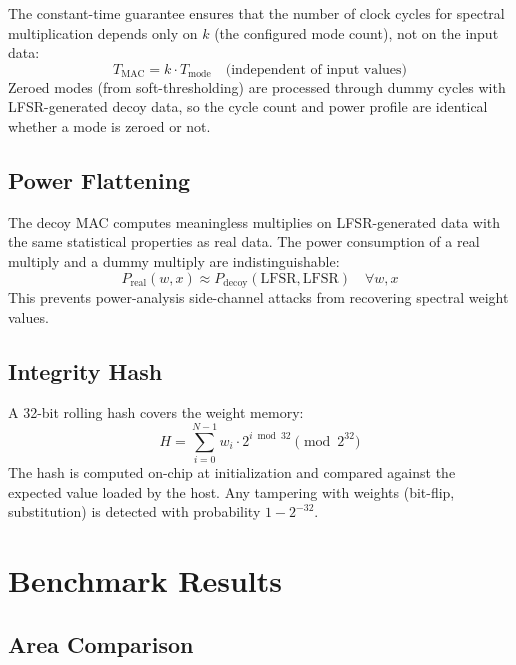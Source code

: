 \documentclass[11pt,a4paper]{article}
\theoremstyle{definition}
\theoremstyle{remark}
\begin{document}
The constant-time guarantee ensures that the number of clock cycles for spectral
multiplication depends only on $k$ (the configured mode count), not on the input
data:
\begin{equation}
  T_{\text{MAC}} = k \cdot T_{\text{mode}} \quad \text{(independent of input values)}
\end{equation}
Zeroed modes (from soft-thresholding) are processed through dummy cycles with
LFSR-generated decoy data, so the cycle count and power profile are identical
whether a mode is zeroed or not.

\subsection{Power Flattening}

The decoy MAC computes meaningless multiplies on LFSR-generated data with the
same statistical properties as real data. The power consumption of a real
multiply and a dummy multiply are indistinguishable:
\begin{equation}
  P_{\text{real}}(w, x) \approx P_{\text{decoy}}(\text{LFSR}, \text{LFSR}) \quad \forall w, x
\end{equation}
This prevents power-analysis side-channel attacks from recovering spectral
weight values.

\subsection{Integrity Hash}

A 32-bit rolling hash covers the weight memory:
\begin{equation}
  H = \sum_{i=0}^{N-1} w_i \cdot 2^{i \bmod 32} \pmod{2^{32}}
\end{equation}
The hash is computed on-chip at initialization and compared against the expected
value loaded by the host. Any tampering with weights (bit-flip, substitution)
is detected with probability $1 - 2^{-32}$.

\section{Benchmark Results}

\subsection{Area Comparison}
\end{document}
